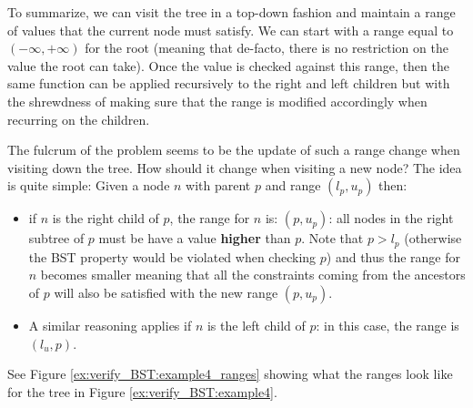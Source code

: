 To summarize, we can visit the tree in a top-down fashion and maintain a range of values that the current node must satisfy. We can start with a range equal to $(-\infty, +\infty)$ for the root (meaning that de-facto, there is no restriction on the value the root can take).
Once the value is checked against this range, then the same function can be applied recursively to the right and left children but with the shrewdness of making sure that the range is modified accordingly when recurring on the children. 

The fulcrum of the problem seems to be the update of such a range change when visiting down the tree. How should it change when visiting a new node? 
The idea is quite simple:
Given a node $n$ with parent $p$ and range \( (l_p, u_p) \) then:
\begin{itemize}
	\item if $n$ is the right child of $p$, the range for $n$ is: $(p, u_p)$:
	all nodes in the right subtree of $p$ must be have a value \textbf{higher} than $p$. 
	Note that $p > l_p$ (otherwise the BST property would be violated when checking $p$) and thus the range for $n$ becomes smaller meaning that all the constraints coming from the ancestors of $p$ will also be satisfied with the new range $(p, u_p)$.
	\item A similar reasoning applies if $n$ is the left child of $p$: in this case, the range is $(l_u,p)$.
\end{itemize}
See Figure \ref{ex:verify_BST:example4_ranges} showing what the ranges look like for the tree in Figure \ref{ex:verify_BST:example4}. 


